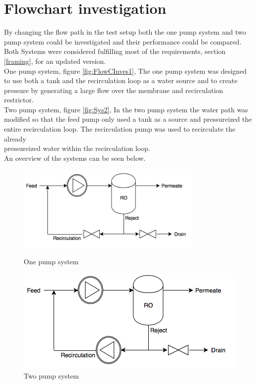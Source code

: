 \section{Flowchart investigation}
By changing the flow path in the test setup both the one pump system and two pump system could be investigated and their performance could be compared. Both Systems were considered fulfilling most of the requirements, section \ref{framing}, for an updated version. \\

One pump system, figure \ref{fig:FlowCInves1}, The one pump system was designed to use both a tank and the recirculation loop as a water source and to create pressure by generating a large flow over the membrane and recirculation restrictor. \\


Two pump system, figure \ref{fig:Sys2}, In the two pump system the water path was modified so that the feed pump only used a tank as a source and pressureized the entire recirculation loop. The recirculation pump was used to recirculate the already\\ pressureized water within the recirculation loop.\\


An overview of the systems can be seen below.\\
\begin{figure}[h]
\centering
\begin{minipage}{.5\textwidth}
    \centering
    \includegraphics[width=0.8\textwidth]{Sys1}
    \caption{One pump system}
    \label{fig:System1}
\end{minipage}%
\begin{minipage}{.5\textwidth}
  \centering
  \includegraphics[width=.8\linewidth]{Sys2}
  \caption{Two pump system}
  \label{fig:System2}
\end{minipage}
\end{figure}


